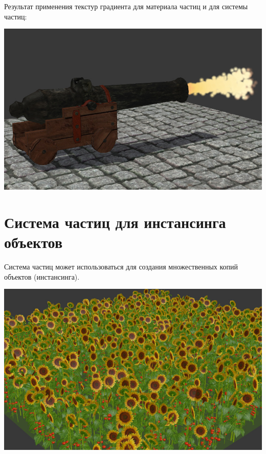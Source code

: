 \documentclass[a4paper,12pt,oneside]{sphinxmanual}
\begin{document}
\begin{DUlineblock}{0em}
\item[] 
\end{DUlineblock}

Результат применения текстур градиента для материала частиц и для системы частиц:

{\hfill\includegraphics[width=1.000\linewidth]{particles_gun.jpg}\hfill}
\label{particles_instancing:particles-instancing}

\chapter{Система частиц для инстансинга объектов}
\label{particles_instancing:index-0}\label{particles_instancing::doc}\label{particles_instancing:id1}
Система частиц может использоваться для создания множественных копий объектов (инстансинга).

{\hfill\includegraphics[width=1.000\linewidth]{particles_instancing_example.jpg}\hfill}
\end{document}
